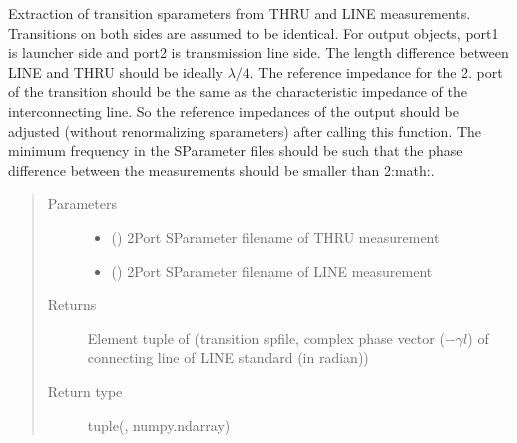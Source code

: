 \documentclass[letterpaper,10pt,english]{sphinxmanual}
\begin{document}

\begin{fulllineitems}
\label{\detokenize{touchstone:touchstone.thru_line_deembedding}}
Extraction of transition s\sphinxhyphen{}parameters from THRU and LINE measurements. Transitions on both sides are assumed to be identical. For output  objects, port\sphinxhyphen{}1 is launcher side and port\sphinxhyphen{}2 is transmission line side. The length difference between LINE and THRU should be ideally \(\lambda/4\).
The reference impedance for the 2. port of the transition should be the same as the characteristic impedance of the interconnecting line. So the reference impedances of the output  should be adjusted (without renormalizing s\sphinxhyphen{}parameters) after calling this function. The minimum frequency in the S\sphinxhyphen{}Parameter files should be such that the phase difference between the measurements should be smaller than 2:math:.
\begin{quote}\begin{description}
\item[{Parameters}] \leavevmode\begin{itemize}
\item {} 
 () \textendash{} 2\sphinxhyphen{}Port S\sphinxhyphen{}Parameter filename of THRU measurement

\item {} 
 () \textendash{} 2\sphinxhyphen{}Port S\sphinxhyphen{}Parameter filename of LINE measurement

\end{itemize}

\item[{Returns}] \sphinxhyphen{}Element tuple of (transition spfile, complex phase vector (\(-\gamma l\)) of connecting line of LINE standard (in radian))

\item[{Return type}] \leavevmode
tuple({\hyperref[\detokenize{touchstone:touchstone.spfile}]{}}, numpy.ndarray)

\end{description}\end{quote}

\end{fulllineitems}
\end{document}
